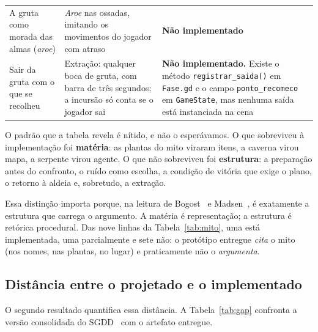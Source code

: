 \documentclass[conference]{IEEEtran}
\begin{document}
\begin{table}[t]
\begin{tabular}{p{3.9cm}p{5.6cm}p{5.6cm}}
A gruta como morada das almas (\textit{aroe}) &
\textit{Aroe} nas ossadas, imitando os movimentos do jogador com atraso &
\textbf{Não implementado} \\[2pt]

Sair da gruta com o que se recolheu &
Extração: qualquer boca de gruta, com barra de três segundos; a incursão só conta se o jogador sai &
\textbf{Não implementado.} Existe o método \texttt{registrar\_saida()} em \texttt{Fase.gd} e o campo \texttt{ponto\_recomeco} em \texttt{GameState}, mas nenhuma saída está instanciada na cena \\
\bottomrule
\end{tabular}
\end{table}

O padrão que a tabela revela é nítido, e não o esperávamos. O que sobreviveu à
implementação foi \textbf{matéria}: as plantas do mito viraram itens, a caverna virou
mapa, a serpente virou agente. O que não sobreviveu foi \textbf{estrutura}: a preparação
antes do confronto, o ruído como escolha, a condição de vitória que exige o plano, o
retorno à aldeia e, sobretudo, a extração.

Essa distinção importa porque, na leitura de Bogost~\cite{bogost2007} e
Madsen~\cite{madsen2017}, é exatamente a estrutura que carrega o argumento. A matéria é
representação; a estrutura é retórica procedural. Das nove linhas da
Tabela~\ref{tab:mito}, uma está implementada, uma parcialmente e sete não: o protótipo
entregue \emph{cita} o mito (nos nomes, nas plantas, no lugar) e praticamente não o
\textit{argumenta}.

\subsection{Distância entre o projetado e o implementado}

O segundo resultado quantifica essa distância. A Tabela~\ref{tab:gap} confronta a versão
consolidada do SGDD~\cite{sgdd2026} com o artefato entregue.
\end{document}
